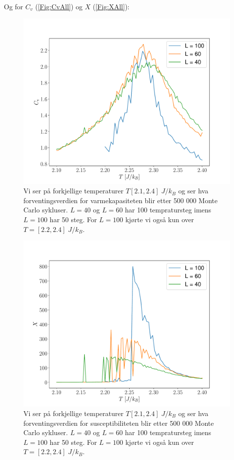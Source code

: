 \documentclass[reprint,english,notitlepage]{revtex4-2}  %
\begin{document}
Og for $C_v$ (\autoref{Fig:CvAll}) og $X$ (\autoref{Fig:XAll}):


\begin{figure}[H]
\centering
\includegraphics[scale=0.4, trim=2.5cm 0 0 0 ]{../Images/CvPerTAll.pdf}
\caption{Vi ser på forkjellige temperaturer $T [2.1, 2.4] \; J/k_B$ og ser hva forventingsverdien for varmekapasiteten blir etter 500 000 Monte Carlo sykluser. $L = 40$ og $L = 60$ har 100 tempratursteg imens $L = 100$ har 50 steg. For $L = 100$ kjørte vi også kun over $ T = [2.2, 2.4] \; J/k_B$.}
\label{Fig:CvAll}
\end{figure}

\begin{figure}[H]
\centering
\includegraphics[scale=0.4, trim=2.5cm 0 0 0 ]{../Images/XPerTAll.pdf}
\caption{Vi ser på forkjellige temperaturer $T [2.1, 2.4] \; J/k_B$ og ser hva forventingsverdien for susceptibiliteten blir etter 500 000 Monte Carlo sykluser. $L = 40$ og $L = 60$ har 100 tempratursteg imens $L = 100$ har 50 steg. For $L = 100$ kjørte vi også kun over $ T = [2.2, 2.4] \; J/k_B$.}
\label{Fig:XAll}
\end{figure}
\end{document}
